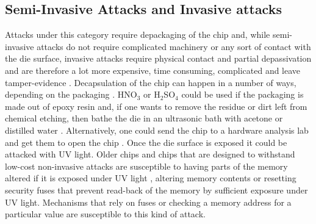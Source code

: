 \subsection{Semi-Invasive Attacks and Invasive attacks}
Attacks under this category require depackaging of the chip and, while semi-invasive attacks do not require complicated machinery or any sort of contact with the die surface, invasive attacks require physical contact and partial depassivation and are therefore a lot more expensive, time consuming, complicated and leave tamper-evidence \citep{sergei:thesis} \citep{gutman:memory_remanence}. Decapsulation of the chip can happen in a number of ways, depending on the packaging \citep{hwre} \citep{ic_decap}. HNO$_3$ or H$_2$SO$_4$ could be used if the packaging is made out of epoxy resin and, if one wants to remove the residue or dirt left from chemical etching, then bathe the die in an ultrasonic bath with acetone or distilled water \citep{sergei:thesis} \citep{hwre} \citep{ic_decap}. Alternatively, one could send the chip to a hardware analysis lab and get them to open the chip \citep{website:hacking_the_pic}. 
Once the die surface is exposed it could be attacked with UV light. Older chips and chips that are designed to withstand low-cost non-invasive attacks are susceptible to having parts of the memory altered if it is exposed under UV light \citep{sergei:thesis} \citep{hwre}, altering memory contents or resetting security fuses that prevent read-back of the memory by sufficient exposure under UV light. Mechanisms that rely on fuses or checking a memory address for a particular value are susceptible to this kind of attack.

